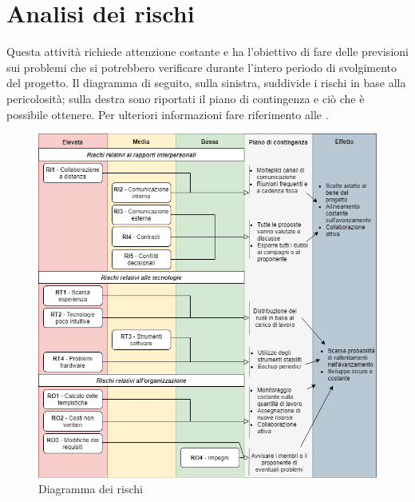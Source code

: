 \section{Analisi dei rischi}

Questa attività richiede attenzione costante e ha l'obiettivo di fare delle previsioni sui problemi che si potrebbero verificare durante l'intero periodo di svolgimento del progetto. Il diagramma di seguito, sulla sinistra, suddivide i rischi in base alla pericolosità; sulla destra sono riportati il piano di contingenza e ciò che è possibile ottenere. Per ulteriori informazioni fare riferimento alle .

\begin{figure}[!htb]
\includegraphics[width=17.5cm]{Images/rischi}
\caption{Diagramma dei rischi}
\end{figure}

\renewcommand{\arraystretch}{2}%
